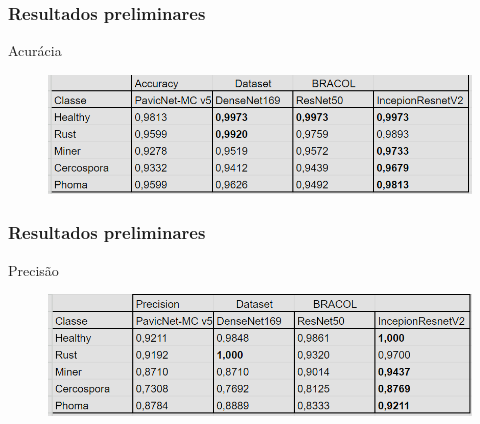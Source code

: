 \documentclass[aspectratio=169]{beamer}
\begin{document}






\begin{frame}
    \frametitle{Resultados preliminares}

    \centering
    Acurácia

    \begin{figure}
        \centering
        \includegraphics[scale = 0.7]{img/acc.png}
        \label{fig:enter-label}
    \end{figure}



\end{frame}


















\begin{frame}
    \frametitle{Resultados preliminares}

    \centering
    Precisão

    \begin{figure}
        \centering
        \includegraphics[scale = 0.7]{img/precision.png}
        \label{fig:enter-label}
    \end{figure}



\end{frame}
\end{document}
